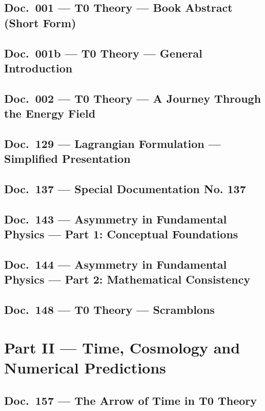 	\chapter{Doc.~001 --- T0 Theory — Book Abstract (Short Form)}
	
	\chapter{Doc.~001b --- T0 Theory — General Introduction}
	
	\chapter{Doc.~002 --- T0 Theory — A Journey Through the Energy Field}
	
	\chapter{Doc.~129 --- Lagrangian Formulation — Simplified Presentation}
	
	\chapter{Doc.~137 --- Special Documentation No. 137}
	
	\chapter{Doc.~143 --- Asymmetry in Fundamental Physics — Part 1: Conceptual Foundations}
	
	\chapter{Doc.~144 --- Asymmetry in Fundamental Physics — Part 2: Mathematical Consistency}
	
	\chapter{Doc.~148 --- T0 Theory — Scramblons}
	
	\part{Part II --- Time, Cosmology and Numerical Predictions}
	\chapter{Doc.~157 --- The Arrow of Time in T0 Theory}
	
